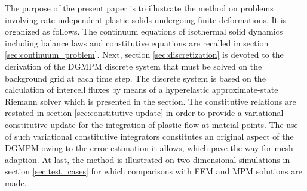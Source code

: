 The purpose of the present paper is to illustrate the method on problems involving rate-independent plastic solids undergoing finite deformations.
It is organized as follows.
The continuum equations of isothermal solid dynamics including balance laws and constitutive equations are recalled in section \ref{sec:continuum_problem}.
Next, section \ref{sec:discretization} is devoted to the derivation of the DGMPM discrete system that must be solved on the background grid at each time step. 
The discrete system is based on the calculation of intercell fluxes by means of a hyperelastic approximate-state Riemann solver which is presented in the section.
The constitutive relations are restated in section \ref{sec:constitutive-update} in order to provide a variational constitutive update \cite{Laurent99} for the integration of plastic flow at mateial points.
The use of such variational constitutive integrators constitutes an original aspect of the DGMPM owing to the error estimation it allows, which pave the way for mesh adaption.
At last, the method is illustrated on two-dimensional simulations in section \ref{sec:test_cases} for which comparisons with FEM and MPM solutions are made.



